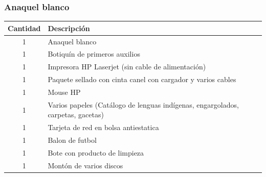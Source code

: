 \documentclass[a4paper,11pt]{article}                 %
\begin{document}
  \subsubsection{Anaquel blanco}
    \begin{table}[H]
    \centering
    \begin{tabular}{|c|l|}
    \hline
    Cantidad & Descripción                                                                     \\ \hline
    1        & Anaquel blanco                                                                  \\ \hline
    1        & Botiquín de primeros auxilios                                                   \\ \hline
    1        & Impresora HP Laserjet (sin cable de alimentación)                               \\ \hline
    1        & Paquete sellado con cinta canel con cargador y varios cables                    \\ \hline
    1        & Mouse HP                                                                        \\ \hline
    1        & Varios papeles (Catálogo de lenguas indígenas, engargolados, carpetas, gacetas) \\ \hline
    1        & Tarjeta de red en bolsa antiestatica                                            \\ \hline
    1        & Balon de futbol                                                                 \\ \hline  
    1        & Bote con producto de limpieza                                                   \\ \hline  
    1        & Montón de varios discos                                                         \\ \hline
    \end{tabular}
    \end{table} 
\end{document}
